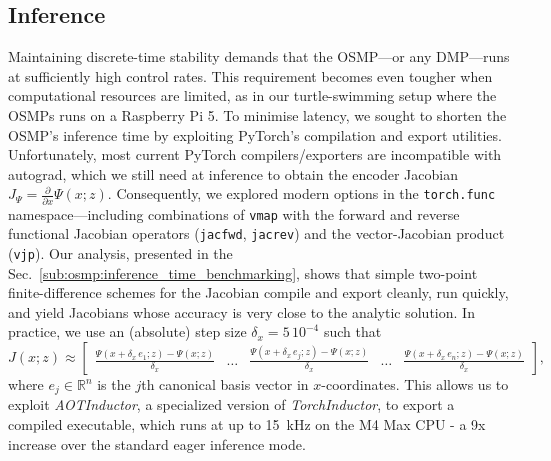 
\subsection{Inference}
Maintaining discrete-time stability demands that the \gls{OSMP}—or any \gls{DMP}—runs at sufficiently high control rates. This requirement becomes even tougher when computational resources are limited, as in our turtle-swimming setup where the \glspl{OSMP} runs on a Raspberry Pi 5. To minimise latency, we sought to shorten the \gls{OSMP}’s inference time by exploiting PyTorch’s compilation and export utilities. Unfortunately, most current PyTorch compilers/exporters are incompatible with autograd, which we still need at inference to obtain the encoder Jacobian $J_\Psi = \frac{\partial}{\partial x} \Psi(x;z)$. Consequently, we explored modern options in the \texttt{torch.func} namespace—including combinations of \texttt{vmap} with the forward and reverse functional Jacobian operators (\texttt{jacfwd}, \texttt{jacrev}) and the vector-Jacobian product (\texttt{vjp}). Our analysis, presented in the Sec.~\ref{sub:osmp:inference_time_benchmarking}, shows that simple two-point finite-difference schemes for the Jacobian compile and export cleanly, run quickly, and yield Jacobians whose accuracy is very close to the analytic solution.
In practice, we use an (absolute) step size $\delta_x = 5 \, 10^{-4}$ such that
\begin{equation}
    J(x;z) \approx \begin{bmatrix}
        \frac{\Psi(x+\delta_x \, e_1;z) - \Psi(x;z)}{\delta_x} & \dots &         \frac{\Psi(x+\delta_x \, e_j;z) - \Psi(x;z)}{\delta_x} & \dots & \frac{\Psi(x+\delta_x \, e_n;z) - \Psi(x;z)}{\delta_x}
    \end{bmatrix},
\end{equation}
where $e_j \in \mathbb{R}^n$ is the $j$th canonical basis vector in $x$-coordinates.
This allows us to exploit \emph{AOTInductor}, a specialized version of \emph{TorchInductor}, to export a compiled executable, which runs at up to \SI{15}{kHz} on the M4 Max CPU - a 9x increase over the standard eager inference mode.

